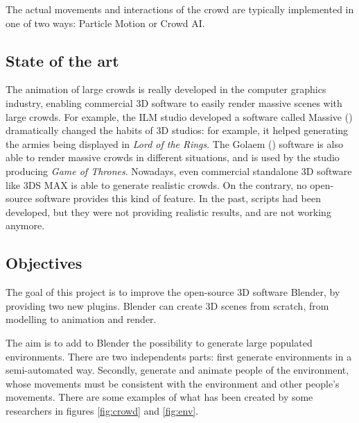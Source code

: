 \documentclass[a4paper,11pt]{article}
\begin{document}
The actual movements and interactions of the crowd are typically
implemented in one of two ways: Particle Motion or Crowd AI.

\subsection{State of the art}

The animation of large crowds is really developed in the computer graphics industry, enabling commercial 3D software to easily render massive scenes with large crowds. For example, the ILM studio developed a software called Massive (\cite{Massive}) dramatically changed the habits of 3D studios: for example, it helped generating the armies being displayed in \textit{Lord of the Rings}. The Golaem (\cite{Golaem}) software is also able to render massive crowds in different situations, and is used by the studio producing \textit{Game of Thrones}. Nowadays, even commercial standalone 3D software like 3DS MAX\cite{3dsmax} is able to generate realistic crowds. On the contrary, no open-source software provides this kind of feature. In the past, scripts had been developed, but they were not providing realistic results, and are not working anymore.



\subsection{Objectives}

The goal of this project is to improve the open-source 3D software Blender, by providing two new plugins. Blender can create 3D scenes from scratch, from modelling to animation and render.

The aim is to add to Blender the possibility to generate large populated environments. There are two independents parts: first generate environments in a semi-automated way. Secondly, generate and animate people of the environment, whose movements must be consistent with the environment and other people's movements. There are some examples of what has been created by some researchers in figures \ref{fig:crowd} and \ref{fig:env}.
\end{document}

